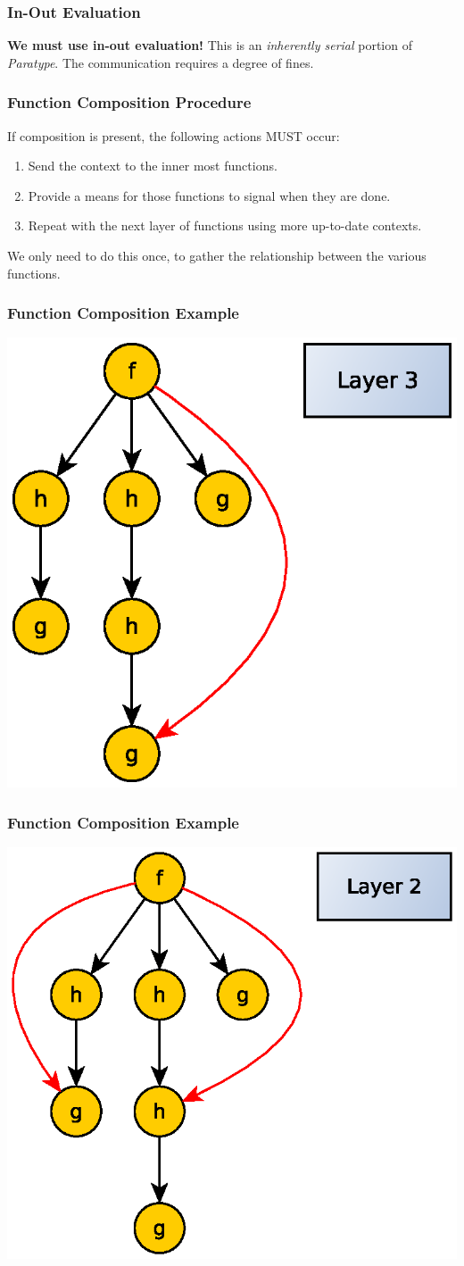 \documentclass{beamer}
\begin{document}
\begin{frame}[fragile]
  \frametitle{In-Out Evaluation}
  \textbf{We must use in-out evaluation!} This is an \emph{inherently
    serial} portion of \emph{Paratype}. The communication requires a
  degree of fines.
\end{frame}

\begin{frame}[fragile]
  \frametitle{Function Composition Procedure}

  If composition is present, the following actions MUST occur:
  \begin{multicols}{2}
    \begin{enumerate}
      \item Send the context to the inner most functions.
      \item Provide a means for those functions to signal when they
        are done.
      \item Repeat with the next layer of functions using more
        up-to-date contexts.
    \end{enumerate}
  \end{multicols}
  We only need to do this once, to gather the relationship between the
  various functions.
\end{frame}

\begin{frame}
  \frametitle{Function Composition Example}
  \centerline{\includegraphics[width=.6\linewidth]{media/inout3.eps}}
\end{frame}

\begin{frame}
  \frametitle{Function Composition Example}
  \centerline{\includegraphics[width=.6\linewidth]{media/inout2.eps}}
\end{frame}
\end{document}
